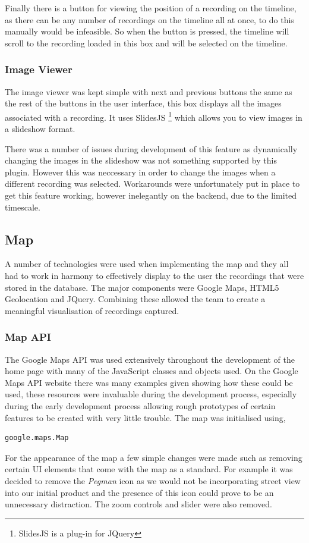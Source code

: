 \documentclass{l3proj}
\begin{document}
Finally there is a button for viewing the position of a recording on the timeline, as there can be any number of recordings on the timeline all at once, to do this manually would be infeasible. So when the button is pressed, the timeline will scroll to the recording loaded in this box and will be selected on the timeline.

\subsubsection{Image Viewer}		The image viewer was kept simple with next and previous buttons the same as the rest of the buttons in the user interface, this box displays all the images associated with a recording. It uses SlidesJS \footnote{SlidesJS is a plug-in for JQuery} which  allows you to view images in a slideshow format.

There was a number of issues during development of this feature as dynamically changing the images in the slideshow was not something supported by this plugin. However this was neccessary in order to change the images when a different recording was selected. Workarounds were unfortunately put in place to get this feature working, however inelegantly on the backend, due to the limited timescale.

\subsection{Map}		A number of technologies were used when implementing the map and they all had to work in harmony to effectively display to the user the recordings that were stored in the database. The major components were Google Maps, HTML5 Geolocation and JQuery. Combining these allowed the team to create a meaningful visualisation of recordings captured.

\subsubsection{Map API}		The Google Maps API was used extensively throughout the development of the home page with many of the JavaScript classes and objects used. On the Google Maps API website there was many examples given showing how these could be used, these resources were invaluable during the development process, especially during the early development process allowing rough prototypes of certain features to be created with very little trouble. The map was initialised using,
\begin{verbatim}
google.maps.Map
\end{verbatim}
For the appearance of the map a few simple changes were made such as removing certain UI elements that come with the map as a standard. For example it was decided to remove the \textit{Pegman} icon as we would not be incorporating street view into our initial product and the presence of this icon could prove to be an unnecessary distraction. The zoom controls and slider were also removed.
\end{document}

